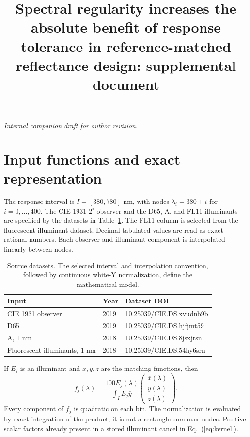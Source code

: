 \documentclass[9pt]{osa-supplemental-document}
\title{Spectral regularity increases the absolute benefit of response tolerance in reference-matched reflectance design: supplemental document}
\author{}
\renewcommand{\eqref}[1]{\textup{(\ref{#1})}}
\begin{document}
\maketitle
\par\medskip
\noindent\textit{Internal companion draft for author revision.}

\section{Input functions and exact representation}
The response interval is $I=[380,780]$ nm, with nodes $\lambda_i=380+i$ for $i=0,\ldots,400$. The CIE 1931 $2^\circ$ observer and the D65, A, and FL11 illuminants are specified by the datasets in Table~\ref{tab:sources}. The FL11 column is selected from the fluorescent-illuminant dataset. Decimal tabulated values are read as exact rational numbers. Each observer and illuminant component is interpolated linearly between nodes.

\begin{table}[htbp]
\centering\small
\caption{Source datasets. The selected interval and interpolation convention, followed by continuous white-Y normalization, define the mathematical model.}
\label{tab:sources}
\begin{tabular}{lll}
\toprule
Input & Year & Dataset DOI\\
\midrule
CIE 1931 observer & 2019 & 10.25039/CIE.DS.xvudnb9b\\
D65 & 2019 & 10.25039/CIE.DS.hjfjmt59\\
A, 1 nm & 2018 & 10.25039/CIE.DS.8jsxjrsn\\
Fluorescent illuminants, 1 nm & 2018 & 10.25039/CIE.DS.54hy6srn\\
\bottomrule
\end{tabular}
\end{table}

If $E_j$ is an illuminant and $\overline x,\overline y,\overline z$ are the matching functions, then
\begin{equation}
 f_j(\lambda)=\frac{100E_j(\lambda)}{\int_I E_j\overline y}
 \begin{pmatrix}\overline x(\lambda)\\\overline y(\lambda)\\\overline z(\lambda)\end{pmatrix}.
 \label{eq:kernel}
\end{equation}
Every component of $f_j$ is quadratic on each bin. The normalization is evaluated by exact integration of the product; it is not a rectangle sum over nodes. Positive scalar factors already present in a stored illuminant cancel in Eq.~\eqref{eq:kernel}.
\end{document}
